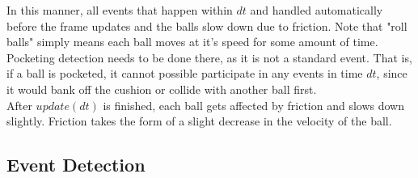 \documentclass[12pt]{article}
\begin{document}
        In this manner, all events that happen within $dt$ and handled automatically before the frame updates and the balls slow
        down due to friction. Note that "roll balls" simply means each ball moves at it's speed for some amount of time. Pocketing
        detection needs to be done there, as it is not a standard event. That is, if a ball is pocketed, it cannot possible participate
        in any events in time $dt$, since it would bank off the cushion or collide with another ball first. \\
        After $update(dt)$ is finished, each ball gets affected by friction and slows down slightly. Friction takes the form of a
        slight decrease in the velocity of the ball. 
        
        \subsection{Event Detection}
\end{document}
